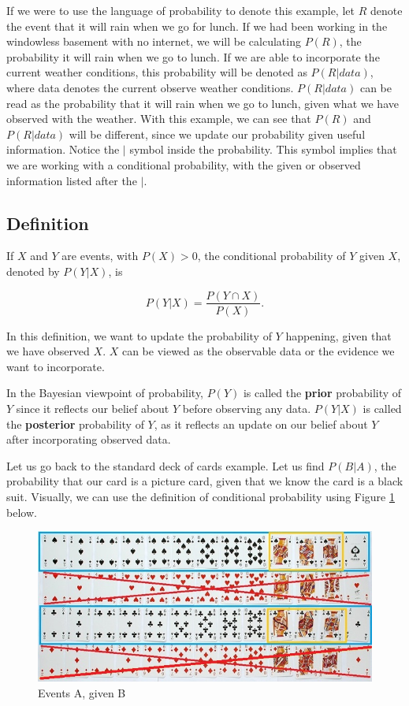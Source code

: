 \documentclass[
]{book}
\begin{document}
If we were to use the language of probability to denote this example, let \(R\) denote the event that it will rain when we go for lunch. If we had been working in the windowless basement with no internet, we will be calculating \(P(R)\), the probability it will rain when we go to lunch. If we are able to incorporate the current weather conditions, this probability will be denoted as \(P(R|data)\), where data denotes the current observe weather conditions. \(P(R|data)\) can be read as the probability that it will rain when we go to lunch, given what we have observed with the weather. With this example, we can see that \(P(R)\) and \(P(R|data)\) will be different, since we update our probability given useful information. Notice the \(|\) symbol inside the probability. This symbol implies that we are working with a conditional probability, with the given or observed information listed after the \(|\).

\hypertarget{def}{%
\subsection{Definition}\label{def}}

If \(X\) and \(Y\) are events, with \(P(X)>0\), the conditional probability of \(Y\) given \(X\), denoted by \(P(Y|X)\), is

\begin{equation} 
P(Y|X) = \frac{P(Y \cap X)}{P(X)}.
\label{eq:cond}
\end{equation}

In this definition, we want to update the probability of \(Y\) happening, given that we have observed \(X\). \(X\) can be viewed as the observable data or the evidence we want to incorporate.

In the Bayesian viewpoint of probability, \(P(Y)\) is called the \textbf{prior} probability of \(Y\) since it reflects our belief about \(Y\) before observing any data. \(P(Y|X)\) is called the \textbf{posterior} probability of \(Y\), as it reflects an update on our belief about \(Y\) after incorporating observed data.

Let us go back to the standard deck of cards example. Let us find \(P(B|A)\), the probability that our card is a picture card, given that we know the card is a black suit. Visually, we can use the definition of conditional probability using Figure \ref{fig:cardscond} below.

\begin{figure}
\centering
\includegraphics{images/02-cardscond.jpg}
\caption{\label{fig:cardscond}Events A, given B}
\end{figure}
\end{document}
